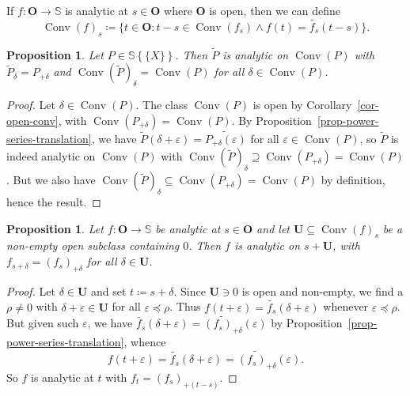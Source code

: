 \documentclass{article}
\newcommand{\assign}{\coloneqq}
\newcommand{\of}{:}
\newcommand{\suchthat}{:}
\newcommand{\tmop}[1]{\ensuremath{\operatorname{#1}}}
\newtheorem{proposition}[theorem]{Proposition}
\theoremstyle{remark}\newtheorem*{convention*}{Convention}
\begin{document}
If $f \of \mathbf{O} \longrightarrow \mathbb{S}$ is analytic at $s \in
\mathbf{O}$ where $\mathbf{O}$ is open, then we can define\label{autolab19}
\[ \tmop{Conv} (f)_s \assign \{ t \in \mathbf{O} \suchthat t - s \in
   \tmop{Conv} (f_s) \wedge f (t) = \widetilde{f_s} (t - s) \} . \]
\begin{proposition}
  \label{prop-analytic-power-series}Let $P \in \mathbb{S} \left\{ \!\! \{ X \}
  \!\! \right\}$. Then $\tilde{P}$ is analytic on $\tmop{Conv} (P)$ with
  $\tilde{P}_{\delta} = P_{+ \delta}$ and $\tmop{Conv} (\tilde{P})_{\delta} =
  \tmop{Conv} (P)$ for all $\delta \in \tmop{Conv} (P)$.
\end{proposition}

\begin{proof}
  Let $\delta \in \tmop{Conv} (P)$. The class $\tmop{Conv} (P)$ is open by
  Corollary~\ref{cor-open-conv}, with $\tmop{Conv} (P_{+ \delta}) =
  \tmop{Conv} (P)$. By Proposition~\ref{prop-power-series-translation}, we
  have $\tilde{P} (\delta + \varepsilon) = \widetilde{P_{+ \delta}
  (\varepsilon)}$ for all $\varepsilon \in \tmop{Conv} (P)$, so $\tilde{P}$ is
  indeed analytic on $\tmop{Conv} (P)$ with $\tmop{Conv} (\tilde{P})_{\delta}
  \supseteq \tmop{Conv} (P_{+ \delta}) = \tmop{Conv} (P)$. But we also have
  $\tmop{Conv} (\tilde{P})_{\delta} \subseteq \tmop{Conv} (P_{+ \delta}) =
  \tmop{Conv} (P)$ by definition, hence the result.
\end{proof}

\begin{proposition}
  \label{prop-analicity-strong}Let $f \of \mathbf{O} \longrightarrow
  \mathbb{S}$ be analytic at $s \in \mathbf{O}$ and let $\mathbf{U} \subseteq
  \tmop{Conv} (f)_s$ be a non-empty open subclass containing $0$. Then $f$ is
  analytic on $s + \mathbf{U}$, with $f_{s + \delta} = (f_s)_{+ \delta}$ for
  all $\delta \in \mathbf{U}$.
\end{proposition}

\begin{proof}
  Let $\delta \in \mathbf{U}$ and set $t \assign s + \delta$. Since
  $\mathbf{U} \ni 0$ is open and non-empty, we find a $\rho \neq 0$ with
  $\delta + \varepsilon \in \mathbf{U}$ for all $\varepsilon \preccurlyeq
  \rho$. Thus $f (t + \varepsilon) = \widetilde{f_s} (\delta + \varepsilon)$
  whenever $\varepsilon \preccurlyeq \rho$. But given such $\varepsilon$, we
  have $\widetilde{f_s} (\delta + \varepsilon) = \widetilde{(f_s)_{+ \delta}}
  (\varepsilon)$ by Proposition~\ref{prop-power-series-translation}, whence
  \[ f (t + \varepsilon) = \widetilde{f_s} (\delta + \varepsilon) =
     \widetilde{(f_s)_{+ \delta}} (\varepsilon) . \]
  So $f$ is analytic at $t$ with $f_t = (f_s)_{+ (t - s)}$.
\end{proof}
\end{document}
